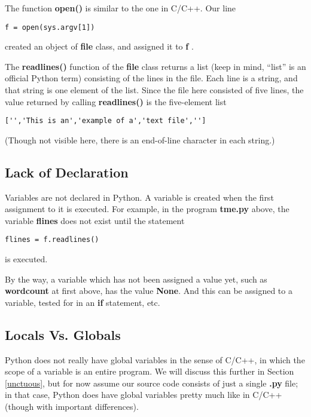 The function {\bf open()} is similar to the one in C/C++.  Our line

\begin{Verbatim}[fontsize=\relsize{-2}]
f = open(sys.argv[1])
\end{Verbatim}

created an object of {\bf file} class, and assigned it to {\bf f} .

The {\bf readlines()} function of the {\bf file} class returns a list
(keep in mind, ``list'' is an official Python term) consisting of the
lines in the file.  Each line is a string, and that string is one
element of the list.  Since the file here consisted of five lines, the
value returned by calling {\bf readlines()} is the five-element list

\begin{Verbatim}[fontsize=\relsize{-2}]
['','This is an','example of a','text file','']
\end{Verbatim}

(Though not visible here, there is an end-of-line character in each string.)

\subsection{Lack of Declaration}
\label{decl}

Variables are not declared in Python.  A variable is created when the
first assignment to it is executed.  For example, in the program {\bf
tme.py} above, the variable {\bf flines} does not exist until the
statement

\begin{Verbatim}[fontsize=\relsize{-2}]
flines = f.readlines()
\end{Verbatim}

is executed.  

By the way, a variable which has not been assigned a value yet, such as
{\bf wordcount} at first above, has the value {\bf None}. And this can
be assigned to a variable, tested for in an {\bf if} statement, etc.

\subsection{Locals Vs. Globals}

Python does not really have global variables in the sense of C/C++, in
which the scope of a variable is an entire program.  We will discuss
this further in Section \ref{unctuous}, but for now assume our source
code consists of just a single {\bf .py} file; in that case, Python does
have global variables pretty much like in C/C++ (though with important
differences).

